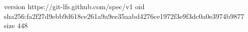 version https://git-lfs.github.com/spec/v1
oid sha256:fa2f27d9ebb9d618ce261a9a9ee35aabd4276ce1972f3e9f3dc0a0e3974b9877
size 448
